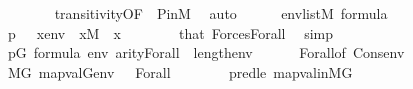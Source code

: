 \begin{isabellebody}
\ \ \ \ \ \ \isamarkupfalse%
\ transitivity{\isacharbrackleft}{\kern0pt}OF\ {\isacharunderscore}{\kern0pt}\ P{\isacharunderscore}{\kern0pt}in{\isacharunderscore}{\kern0pt}M{\isacharbrackright}{\kern0pt}\ \isamarkupfalse%
\ auto\isanewline
\ \ \ \ \isamarkupfalse%
\ {\isacartoucheopen}env{\isasymin}list{\isacharparenleft}{\kern0pt}M{\isacharparenright}{\kern0pt}{\isacartoucheclose}\ {\isacartoucheopen}{\isasymphi}{\isasymin}formula{\isacartoucheclose}\isanewline
\ \ \ \ \isamarkupfalse%
\ {\isachardoublequoteopen}p\ {\isasymtturnstile}\ {\isasymphi}\ {\isacharparenleft}{\kern0pt}{\isacharbrackleft}{\kern0pt}x{\isacharbrackright}{\kern0pt}{\isacharat}{\kern0pt}env{\isacharparenright}{\kern0pt}{\isachardoublequoteclose}\ \ {\isachardoublequoteopen}x{\isasymin}M{\isachardoublequoteclose}\ \ x\isanewline
\ \ \ \ \ \ \isamarkupfalse%
\ that\ Forces{\isacharunderscore}{\kern0pt}Forall\ \isamarkupfalse%
\ simp\isanewline
\ \ \ \ \isamarkupfalse%
\ {\isacartoucheopen}p{\isasymin}G{\isacartoucheclose}\ {\isacartoucheopen}{\isasymphi}{\isasymin}formula{\isacartoucheclose}\ {\isacartoucheopen}env{\isasymin}{\isacharunderscore}{\kern0pt}{\isacartoucheclose}\ {\isacartoucheopen}arity{\isacharparenleft}{\kern0pt}Forall{\isacharparenleft}{\kern0pt}{\isasymphi}{\isacharparenright}{\kern0pt}{\isacharparenright}{\kern0pt}\ {\isasymle}\ length{\isacharparenleft}{\kern0pt}env{\isacharparenright}{\kern0pt}{\isacartoucheclose}\isanewline
\ \ \ \ \ \ Forall{\isacharparenleft}{\kern0pt}{}{\isacharparenright}{\kern0pt}{\isacharbrackleft}{\kern0pt}of\ {\isachardoublequoteopen}Cons{\isacharparenleft}{\kern0pt}{\isacharunderscore}{\kern0pt}{\isacharcomma}{\kern0pt}env{\isacharparenright}{\kern0pt}{\isachardoublequoteclose}{\isacharbrackright}{\kern0pt}\ \isanewline
\ \ \ \ \isamarkupfalse%
\ {\isachardoublequoteopen}M{\isacharbrackleft}{\kern0pt}G{\isacharbrackright}{\kern0pt}{\isacharcomma}{\kern0pt}\ map{\isacharparenleft}{\kern0pt}val{\isacharparenleft}{\kern0pt}G{\isacharparenright}{\kern0pt}{\isacharcomma}{\kern0pt}env{\isacharparenright}{\kern0pt}\ {\isasymTurnstile}\ \ Forall{\isacharparenleft}{\kern0pt}{\isasymphi}{\isacharparenright}{\kern0pt}{\isachardoublequoteclose}\isanewline
\ \ \ \ \ \ \isamarkupfalse%
\ pred{\isacharunderscore}{\kern0pt}le{}\ map{\isacharunderscore}{\kern0pt}val{\isacharunderscore}{\kern0pt}in{\isacharunderscore}{\kern0pt}MG\isanewline
\ \ \ \ \ \ \isamarkupfalse%

\end{isabellebody}
